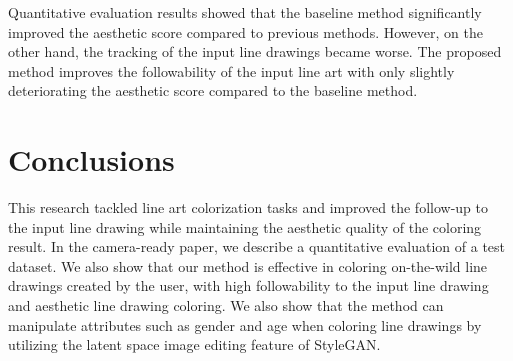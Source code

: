 \documentclass[a4paper]{article}
\newenvironment{Figure}
  {\par\medskip\noindent\minipage{\linewidth}}
  {\endminipage\par\medskip}
\newcommand{\aftersection}{\vspace{-5pt}}
\newcommand{\beforesection}{\vspace{-10pt}}
\newcommand{\beforecaption}{\vspace{-10pt}}
\begin{document}
\begin{multicols}{2}
\begin{Figure}
\beforecaption
{}
\label{tab:metrics}
\end{Figure}
Quantitative evaluation results showed that the baseline method significantly improved the aesthetic score compared to previous methods. However, on the other hand, the tracking of the input line drawings became worse. The proposed method improves the followability of the input line art with only slightly deteriorating the aesthetic score compared to the baseline method.

\beforesection
\section*{Conclusions}
\aftersection

This research tackled line art colorization tasks and improved the follow-up to the input line drawing while maintaining the aesthetic quality of the coloring result.
In the camera-ready paper, we describe a quantitative evaluation of a test dataset. We also show that our method is effective in coloring on-the-wild line drawings created by the user, with high followability to the input line drawing and aesthetic line drawing coloring. We also show that the method can manipulate attributes such as gender and age when coloring line drawings by utilizing the latent space image editing feature of StyleGAN.



\end{multicols}
\end{document}
